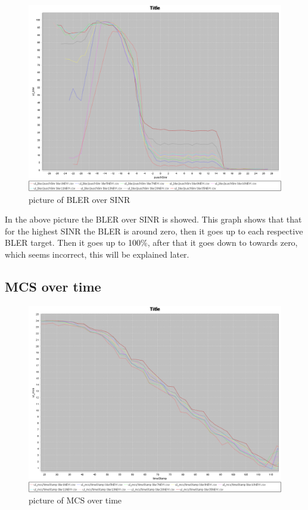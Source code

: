\documentclass[cropmarks, frame, english]{idamasterthesis}
\begin{document}
\begin{figure}[h]
\includegraphics[width=\textwidth]{ulBLEROverSINR}
\centering
\caption{picture of BLER over SINR}
\end{figure}

In the above picture the BLER over SINR is showed. This graph shows that that for the highest SINR the BLER is around zero, then it goes up to each respective BLER target. Then it goes up to 100\%, after that it goes down to towards zero, which seems incorrect, this will be explained later.
\newpage
\subsection{MCS over time}

\begin{figure}[h]
\includegraphics[width=\textwidth]{ulMCSOverTime}
\centering
\caption{picture of MCS over time}
\end{figure}
\end{document}
